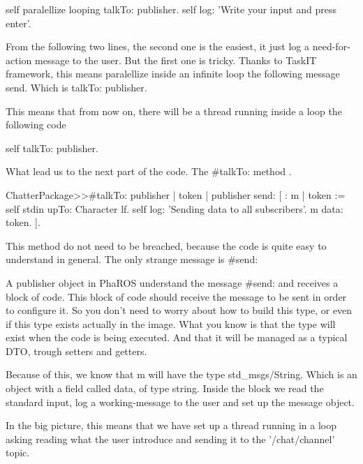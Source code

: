 \documentclass[a4paper,10pt,twoside]{book}
\begin{document}
			\begin{code}
				self paralellize looping talkTo: publisher.
				self log: 'Write your input and press enter'.
			\end{code}
			
				From the following two lines, the second one is the easiest, it just log a need-for-action message to the user. But the first one is tricky. Thanks to TaskIT framework, this means paralellize inside an infinite loop the following message send. Which is talkTo: publisher.
				
				This means that from now on, there will be a thread running inside a loop the following code
				
			\begin{code}
				self talkTo: publisher.
			\end{code}
					
					
				What lead us to the next part of the code. The \#talkTo: method .		
			
			
			\begin{code}
			ChatterPackage>>#talkTo: publisher
				| token |
				publisher send: [ : m | 
					token := self stdin upTo: Character lf.
					self log: 'Sending data to all subscribers'.
					m data: token. 
				].	
			\end{code}
			
				This method do not need to be breached, because the code is quite easy to understand in general. The only strange message is \#send: 
			
				A publisher object in PhaROS understand the message \#send: and receives a block of code. This block of code should receive the message to be sent in order to configure it. So you don't need to worry about how to build this type, or even if this type exists actually in the image. What you know is that the type will exist when the code is being executed. And that it will be managed as a typical DTO, trough setters and getters. 
			
				Because of this, we know that m will have the type std\_msgs/String. Which is an object with a field called data, of type string.
				Inside the block we read the standard input, log a working-message to the user and set up the message object. 
				
				In the big picture, this means that we have set up a thread running in a loop asking reading what the user introduce and sending it to the '/chat/channel' topic.	
				
				
				
\end{document}
